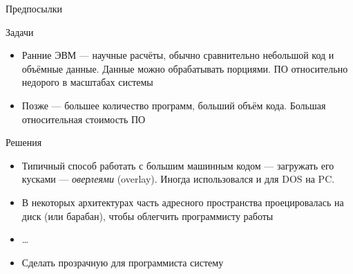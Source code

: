 \documentclass[xetex,aspectratio=43]{beamer}
\begin{document}
\begin{frame}{Предпосылки}
    \begin{block}{Задачи}
        \begin{itemize}
            \tightlist
            \item
            Ранние ЭВМ --- научные расчёты, обычно сравнительно небольшой код и
            объёмные данные. Данные можно обрабатывать порциями. ПО относительно
            недорого в масштабах системы
            \item
            Позже --- большее количество программ, больший объём кода. Большая
            относительная стоимость ПО
        \end{itemize}
    \end{block}

    \begin{block}{Решения}
        \begin{itemize}
            \tightlist
            \item
            Типичный способ работать с большим машинным кодом --- загружать его
            кусками --- \emph{оверлеями} (overlay). Иногда использовался и для DOS
            на PC.
            \item
            В некоторых архитектурах часть адресного пространства проецировалась
            на диск (или барабан), чтобы облегчить программисту работы
            \item
            \ldots{}
            \item
            Сделать прозрачную для программиста систему
        \end{itemize}
    \end{block}
\end{frame}
\end{document}
